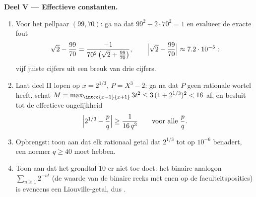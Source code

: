 \begin{problem}
\medskip
\noindent\textbf{Deel V --- Effectieve constanten.}
\begin{enumerate}[resume]
  \item Voor het pellpaar $(99, 70)$: ga na dat $99^2 -
        2\cdot70^2 = 1$ en evalueer de exacte fout
        \[
        \sqrt2 - \frac{99}{70}
        = \frac{-1}{70^2\,\bigl(\sqrt2 + \frac{99}{70}\bigr)},
        \qquad
        \Bigl|\sqrt 2 - \frac{99}{70}\Bigr| \approx 7.2\cdot
        10^{-5} :
        \]
        vijf juiste cijfers uit een breuk van drie cijfers.
  \item Laat deel II lopen op $x = 2^{1/3}$, $P = X^3 - 2$: ga na
        dat $P$ geen rationale wortel heeft, schat $M =
        \max_{\intcc{x-1}{x+1}} 3t^2 \leq 3\,(1 + 2^{1/3})^2 <
        16$ af, en besluit tot de effectieve ongelijkheid
        \[
        \Bigl| 2^{1/3} - \frac pq \Bigr| \geq
        \frac{1}{16\,q^3} \qquad \text{voor alle } \frac pq .
        \]
  \item Opbrengst: toon aan dat elk rationaal getal dat $2^{1/3}$
        tot op $10^{-6}$ benadert, een noemer $q \geq 40$ moet
        hebben.
  \item Toon aan dat het grondtal $10$ er niet toe doet: het
        binaire analogon $\sum_{n\geq1} 2^{-n!}$ (de waarde van de
        binaire reeks met enen op de faculteitsposities) is
        eveneens een Liouville-getal, dus .
\end{enumerate}


\end{problem}
